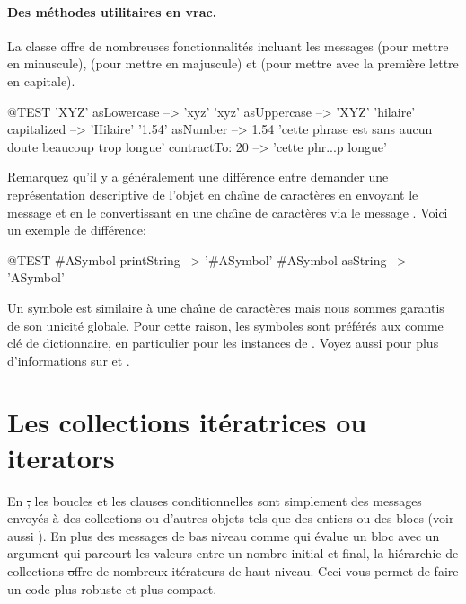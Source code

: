 \documentclass[a4paper,10pt,twoside]{book}
\begin{document}
\paragraph{Des m\'ethodes utilitaires en vrac.}
La classe  offre de nombreuses fonctionnalit\'es incluant les 
messages  (pour mettre en minuscule),  (pour mettre en majuscule) et  (pour mettre avec la premi\`ere lettre en capitale). 

\begin{code}{@TEST}
'XYZ' asLowercase --> 'xyz'
'xyz' asUppercase   --> 'XYZ'
'hilaire' capitalized   --> 'Hilaire'
'1.54' asNumber      --> 1.54
'cette phrase est sans aucun doute beaucoup trop longue' contractTo: 20 -->  'cette phr...p longue'
\end{code}

Remarquez qu'il y a g\'en\'eralement une diff\'erence entre demander une
repr\'esentation descriptive de l'objet en cha\^{\i}ne de caract\`eres
en envoyant le message
 et en le convertissant en une cha\^{\i}ne de caract\`eres via le message .
Voici un exemple de diff\'erence:

\begin{code}{@TEST}
#ASymbol printString --> '#ASymbol'
#ASymbol asString    --> 'ASymbol'
\end{code}

Un symbole  est similaire \`a une cha\^{\i}ne de caract\`eres
mais nous sommes garantis de son unicit\'e globale. Pour cette raison,
les symboles sont pr\'ef\'er\'es aux  comme cl\'e de dictionnaire,
en particulier pour les instances de .
Voyez aussi  pour plus d'informations sur  et .

\section{Les collections it\'eratrices ou iterators}

En \st, les boucles et les clauses conditionnelles sont simplement
des messages envoy\'es \`a des collections ou d'autres objets
tels que des entiers ou des blocs (voir aussi ).
En plus des messages de bas niveau comme  qui \'evalue un bloc avec un argument qui parcourt les valeurs entre un nombre initial et final,
la hi\'erarchie de collections \st offre de nombreux it\'erateurs de haut niveau.
Ceci vous permet de faire un code plus robuste et plus compact.
\end{document}
